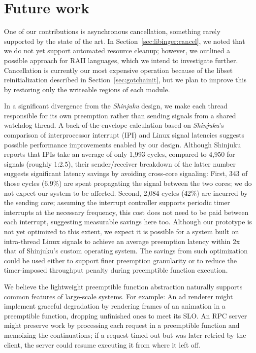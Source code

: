 \section{Future work}

One of our contributions is asynchronous cancellation, something rarely supported by
the state of the art.  In Section~\ref{sec:libinger:cancel}, we noted that we do not
yet support automated resource cleanup; however, we outlined a possible approach for
RAII languages, which we intend to investigate further.  Cancellation is currently
our most expensive operation because of the libset reinitialization described in
Section~\ref{sec:gotchainit}, but we plan to improve this by restoring only the
writeable regions of each module.

In a significant divergence from the \textit{Shinjuku} design, we make each thread
responsible for its own preemption rather than sending signals from a shared watchdog
thread.  A back-of-the-envelope calculation based on \textit{Shinjuku}'s comparison of
interprocessor interrupt (IPI) and Linux signal latencies suggests possible
performance improvements enabled by our design.
Although Shinjuku reports that IPIs take an average of only 1,993 cycles, compared to
4,950 for signals (roughly 1:2.5), their sender/receiver breakdown of the latter
number suggests significant latency savings by avoiding cross-core signaling:
First, 343 of those cycles (6.9\%) are spent propagating the signal between the two
cores; we do not expect our system to be affected.  Second, 2,084 cycles (42\%)
are incurred by the sending core; assuming the interrupt controller supports
periodic timer interrupts at the necessary frequency, this cost does not need to be
paid between each interrupt, suggesting measurable savings here too.  Although
our prototype is not yet optimized to this extent, we expect it is possible for a
system built on intra-thread Linux signals to achieve an average preemption latency
within 2x that of Shinjuku's custom operating system.  The savings from such
optimization could be used either to support finer preemption granularity or to
reduce the timer-imposed throughput penalty during preemptible function execution.

We believe the lightweight preemptible function abstraction naturally supports
common features of large-scale systems.  For example:  An ad renderer might implement
graceful degradation by rendering frames of an animation in a preemptible function,
dropping unfinished ones to meet its SLO.  An RPC server might preserve work by
processing each request in a preemptible function and memoizing the continuations; if
a request timed out but was later retried by the client, the server could resume
executing it from where it left off.

